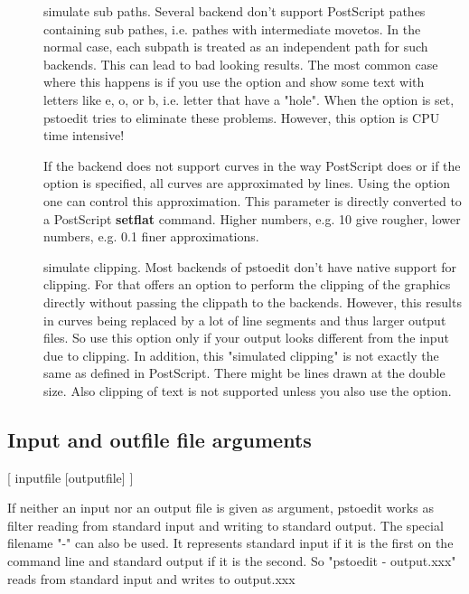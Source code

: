 \documentclass[english,a4paper]{article}
\begin{document}
\begin{description}
\item[] 
simulate sub paths. 
Several backend don't support PostScript pathes containing sub pathes, i.e. pathes with intermediate movetos. In the normal case, each subpath is treated as an independent path for such backends. This can lead to bad looking results. The most common case where this happens is if you use the  option and show some text with letters like e, o, or b, i.e. letter that have a "hole". When the  option is set, pstoedit tries to eliminate these problems. However, this option is CPU time intensive! 


\item[] 
If the backend does not support curves in the way PostScript does or if the  option is specified, all curves are approximated by lines. Using the  option one can control this approximation. This parameter is directly converted to a PostScript \textbf{setflat} command. Higher numbers, e.g. 10 give rougher, lower numbers, e.g. 0.1 finer approximations.  


\item[] 
simulate clipping.  
Most backends of pstoedit don't have native support for clipping. For that  offers an option to perform the clipping of the graphics directly without passing the clippath to the backends. However, this results in curves being replaced by a lot of line segments and thus larger output files. So use this option only if your output looks different from the input due to clipping. In addition, this "simulated clipping" is not exactly the same as defined in PostScript. There might be lines drawn at the double size. Also clipping of text is not supported unless you also use the  option.  


\end{description}
\subsection{Input and outfile file arguments}
[ inputfile [outputfile] ] 


If neither an input nor an output file is given as argument, pstoedit works as filter reading from standard input and
writing to standard output. 
The special filename "-" can also be used. It represents standard input if it is the first on the command line and standard output if it is the second. So "pstoedit - output.xxx" reads from standard input and writes to output.xxx
\end{document}
